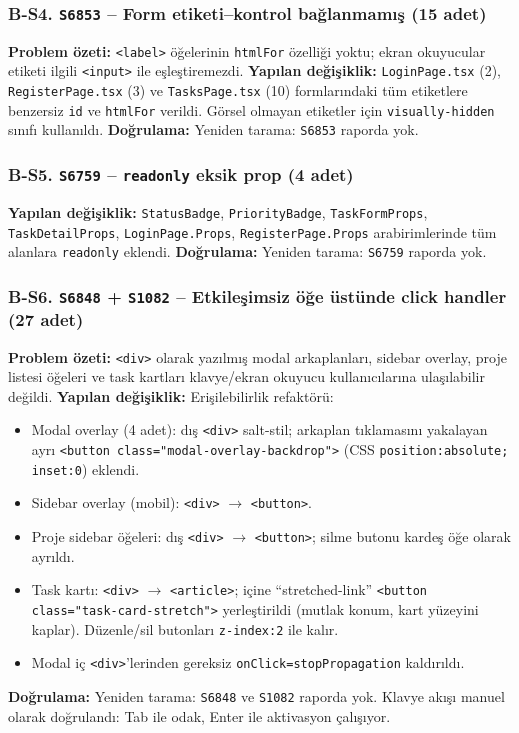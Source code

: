 \documentclass[conference]{IEEEtran}
\begin{document}
\subsubsection{B-S4. \texttt{S6853} -- Form etiketi--kontrol bağlanmamış (15 adet)}
\textbf{Problem özeti:} \texttt{<label>} öğelerinin \texttt{htmlFor}
özelliği yoktu; ekran okuyucular etiketi ilgili \texttt{<input>} ile
eşleştiremezdi.
\textbf{Yapılan değişiklik:} \texttt{LoginPage.tsx} (2),
\texttt{RegisterPage.tsx} (3) ve \texttt{TasksPage.tsx} (10)
formlarındaki tüm etiketlere benzersiz \texttt{id} ve \texttt{htmlFor}
verildi. Görsel olmayan etiketler için \texttt{visually-hidden} sınıfı
kullanıldı.
\textbf{Doğrulama:} Yeniden tarama: \texttt{S6853} raporda yok.

\subsubsection{B-S5. \texttt{S6759} -- \texttt{readonly} eksik prop (4 adet)}
\textbf{Yapılan değişiklik:} \texttt{StatusBadge}, \texttt{PriorityBadge},
\texttt{TaskFormProps}, \texttt{TaskDetailProps}, \texttt{LoginPage.Props},
\texttt{RegisterPage.Props} arabirimlerinde tüm alanlara \texttt{readonly}
eklendi.
\textbf{Doğrulama:} Yeniden tarama: \texttt{S6759} raporda yok.

\subsubsection{B-S6. \texttt{S6848} + \texttt{S1082} -- Etkileşimsiz öğe
üstünde click handler (27 adet)}
\textbf{Problem özeti:} \texttt{<div>} olarak yazılmış modal arkaplanları,
sidebar overlay, proje listesi öğeleri ve task kartları klavye/ekran
okuyucu kullanıcılarına ulaşılabilir değildi.
\textbf{Yapılan değişiklik:} Erişilebilirlik refaktörü:
\begin{itemize}
\item Modal overlay (4 adet): dış \texttt{<div>} salt-stil; arkaplan
  tıklamasını yakalayan ayrı \texttt{<button class="modal-overlay-backdrop">}
  (CSS \texttt{position:absolute; inset:0}) eklendi.
\item Sidebar overlay (mobil): \texttt{<div>} $\to$ \texttt{<button>}.
\item Proje sidebar öğeleri: dış \texttt{<div>} $\to$ \texttt{<button>};
  silme butonu kardeş öğe olarak ayrıldı.
\item Task kartı: \texttt{<div>} $\to$ \texttt{<article>}; içine
  ``stretched-link'' \texttt{<button class="task-card-stretch">}
  yerleştirildi (mutlak konum, kart yüzeyini kaplar). Düzenle/sil butonları
  \texttt{z-index:2} ile kalır.
\item Modal iç \texttt{<div>}'lerinden gereksiz
  \texttt{onClick=stopPropagation} kaldırıldı.
\end{itemize}
\textbf{Doğrulama:} Yeniden tarama: \texttt{S6848} ve \texttt{S1082}
raporda yok. Klavye akışı manuel olarak doğrulandı: Tab ile odak,
Enter ile aktivasyon çalışıyor.
\end{document}
